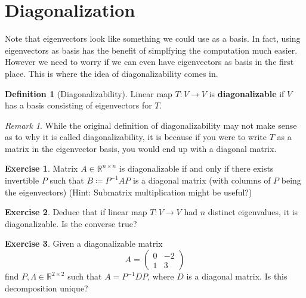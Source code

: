 \documentclass[12pt, a4paper]{article}
\newcommand{\R}{\mathbb{R}}
\theoremstyle{remark}
\newtheorem{remark}{Remark}
\theoremstyle{definition}
\newtheorem{definition}{Definition}
\newtheorem{exercise}{Exercise}
\numberwithin{equation}{section}
\numberwithin{definition}{section}
\numberwithin{example}{section}
\numberwithin{exercise}{section}
\numberwithin{remark}{section}
\numberwithin{figure}{section}
\begin{document}
\section{Diagonalization}
Note that eigenvectors look like something we could use as a basis.
In fact, using eigenvectors as basis has the benefit of simplfying the computation much easier.
However we need to worry if we can even have eigenvectors as basis in the first place.
This is where the idea of diagonalizability comes in.

\begin{definition}[Diagonalizability]
    Linear map $T :V \rightarrow V$ is \textbf{diagonalizable} if $V$ has a basis consisting of eigenvectors for $T$.
\end{definition}
\begin{remark}
    While the original definition of diagonalizability may not make sense as to why it is called diagonalizability,
    it is because if you were to write $T$ as a matrix in the eigenvector basis, you would end up with a diagonal matrix.
\end{remark}
\begin{exercise}
    Matrix $A \in \R^{n \times n}$ is diagonalizable if and only if there exists invertible $P$ such that $B \coloneqq P^{-1} A P$ is a diagonal matrix (with columns of $P$ being the eigenvectors)
    (Hint: Submatrix multiplication might be useful?)
\end{exercise}
\begin{exercise}
    Deduce that if linear map $T:V \rightarrow V$ had $n$ distinct eigenvalues, it is diagonalizable.
    Is the converse true?
\end{exercise}
\begin{exercise}
    Given a diagonalizable matrix
    \begin{equation*}
        A =
        \begin{pmatrix}
            0 & -2 \\ 1 & 3
        \end{pmatrix}
    \end{equation*}
    find $P,\Lambda \in \R^{2 \times 2}$ such that $A = P^{-1} D P$,
    where $D$ is a diagonal matrix.
    Is this decomposition unique?
\end{exercise}
\end{document}
